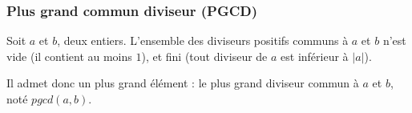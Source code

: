 \subsubsection{Plus grand commun diviseur (PGCD)}
    Soit $a$ et $b$, deux entiers. L'ensemble des diviseurs positifs communs
    à $a$ et $b$ n'est vide (il contient au moins $1$), et fini
    (tout diviseur de $a$ est inférieur à $|a|$).
    
    Il admet donc un plus grand élément : le plus grand diviseur commun
    à $a$ et $b$, noté $pgcd(a, b)$.
